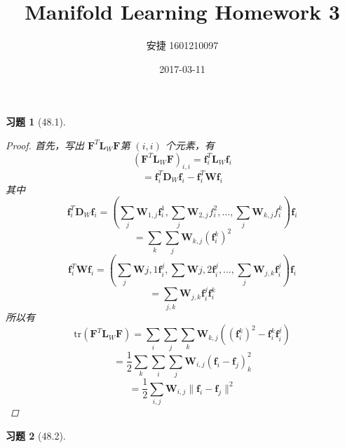 \documentclass[a4paper, UTF8]{ctexart}
\title{Manifold Learning Homework 3}
\date{2017-03-11}
\author{安捷 1601210097}
\newtheorem*{exercise}{\textbf{习题}}
\begin{document}
\maketitle
  \begin{exercise}[48.1]
    \begin{proof}
      首先，写出 $\mathbf{F}^T \mathbf{L}_W \mathbf{F}$第 $\left( i,i \right)$ 个元素，有
      \begin{equation*}
        \left(\mathbf{F}^T \mathbf{L}_W \mathbf{F}\right)_{i,i} = \mathbf{f}_i^T \mathbf{L}_W \mathbf{f}_i
      \end{equation*}
      \begin{equation*}
        = \mathbf{f}_i^T \mathbf{D}_W \mathbf{f}_i - \mathbf{f}_i^T \mathbf{W} \mathbf{f}_i
      \end{equation*}
      其中
      \begin{equation*}
        \mathbf{f}_i^T \mathbf{D}_W \mathbf{f}_i = \left( \sum_j \mathbf{W}_{1,j} \mathbf{f}_i^1, \sum_j \mathbf{W}_{2,j}f_i^2, \dots, \sum_j \mathbf{W}_{k,j} f_i^k \right) \mathbf{f}_i
      \end{equation*}
      \begin{equation*}
        = \sum_k \sum_j \mathbf{W}_{k,j}\left( \mathbf{f}_i^k \right)^2
      \end{equation*}
      \begin{equation*}
        \mathbf{f}_i^T \mathbf{W} \mathbf{f}_i = \left( \sum_j \mathbf{W}{j,1}\mathbf{f}_i^j, \sum \mathbf{W}{j,2}\mathbf{f}_i^j, \dots, \sum_j \mathbf{W}_{j,k}\mathbf{f}_i^j \right)\mathbf{f}_i
      \end{equation*}
      \begin{equation*}
        = \sum_{j,k}\mathbf{W}_{j,k} \mathbf{f}_i^j \mathbf{f}_i^k
      \end{equation*}
      所以有
      \begin{equation*}
        \mathrm{tr}\left( \mathbf{F}^T \mathbf{L}_W \mathbf{F} \right) = \sum_i \sum_j \sum_k \mathbf{W}_{k,j} \left(\left(\mathbf{f}_i^k\right)^2 - \mathbf{f}_i^k \mathbf{f}_i^j \right)
      \end{equation*}
      \begin{equation*}
        = \frac{1}{2} \sum_k \sum_i \sum_j \mathbf{W}_{i,j} \left( \mathbf{f}_i - \mathbf{f}_j \right)_k^2
      \end{equation*}
      \begin{equation*}
        = \frac{1}{2} \sum_{i,j} \mathbf{W}_{i,j} \lVert \mathbf{f}_i - \mathbf{f}_j \rVert^2
      \end{equation*}
    \end{proof}
  \end{exercise}

  \begin{exercise}[48.2]

  \end{exercise}
\end{document}
